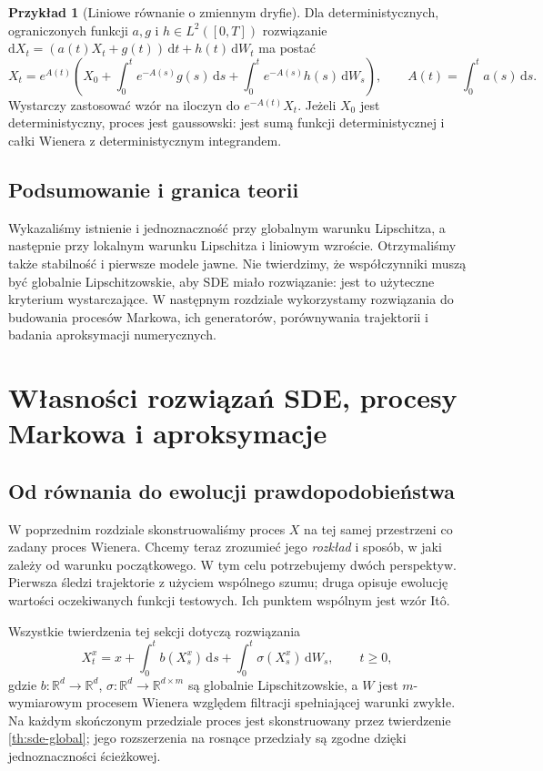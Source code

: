 \documentclass[11pt,a4paper,oneside]{report}
\numberwithin{equation}{chapter}
\theoremstyle{plain}
\theoremstyle{definition}
\newtheorem{przyklad}{Przykład}[chapter]
\theoremstyle{remark}
\newcommand{\R}{\mathbb{R}}
\newcommand{\dd}{\mathrm{d}}
\begin{document}
\begin{przyklad}[Liniowe równanie o zmiennym dryfie]
Dla deterministycznych, ograniczonych funkcji $a,g$
i $h\in L^2([0,T])$ rozwiązanie
$\dd X_t=(a(t)X_t+g(t))\,\dd t+h(t)\,\dd W_t$
ma postać
\[
X_t=e^{A(t)}\left(X_0+\int_0^te^{-A(s)}g(s)\,\dd s
+\int_0^te^{-A(s)}h(s)\,\dd W_s\right),
\qquad A(t)=\int_0^t a(s)\,\dd s.
\]
Wystarczy zastosować wzór na iloczyn do
$e^{-A(t)}X_t$. Jeżeli $X_0$ jest deterministyczny,
proces jest gaussowski: jest sumą funkcji deterministycznej
i całki Wienera z deterministycznym integrandem.
\end{przyklad}

\section{Podsumowanie i granica teorii}
Wykazaliśmy istnienie i jednoznaczność przy globalnym
warunku Lipschitza, a następnie przy lokalnym warunku
Lipschitza i liniowym wzroście. Otrzymaliśmy także
stabilność i pierwsze modele jawne. Nie twierdzimy,
że współczynniki muszą być globalnie Lipschitzowskie,
aby SDE miało rozwiązanie: jest to użyteczne kryterium
wystarczające. W następnym rozdziale wykorzystamy
rozwiązania do budowania procesów Markowa, ich generatorów,
porównywania trajektorii i badania aproksymacji numerycznych.
\chapter{Własności rozwiązań SDE, procesy Markowa i aproksymacje}
\label{ch:sde-properties}

\section{Od równania do ewolucji prawdopodobieństwa}
W poprzednim rozdziale skonstruowaliśmy proces $X$ na tej
samej przestrzeni co zadany proces Wienera. Chcemy teraz
zrozumieć jego \emph{rozkład} i sposób, w jaki zależy od
warunku początkowego. W tym celu potrzebujemy dwóch
perspektyw. Pierwsza śledzi trajektorie z użyciem wspólnego
szumu; druga opisuje ewolucję wartości oczekiwanych
funkcji testowych. Ich punktem wspólnym jest wzór Itô.

Wszystkie twierdzenia tej sekcji dotyczą rozwiązania
\[
X_t^x=x+\int_0^t b(X_s^x)\,\dd s
+\int_0^t\sigma(X_s^x)\,\dd W_s,\qquad t\ge0,
\tag{6.1}\label{eq:timehom-sde}
\]
gdzie $b:\R^d\to\R^d$, $\sigma:\R^d\to\R^{d\times m}$
są globalnie Lipschitzowskie, a $W$ jest $m$-wymiarowym
procesem Wienera względem filtracji spełniającej warunki
zwykłe. Na każdym skończonym przedziale proces jest
skonstruowany przez twierdzenie \ref{th:sde-global};
jego rozszerzenia na rosnące przedziały są zgodne
dzięki jednoznaczności ścieżkowej.
\end{document}
